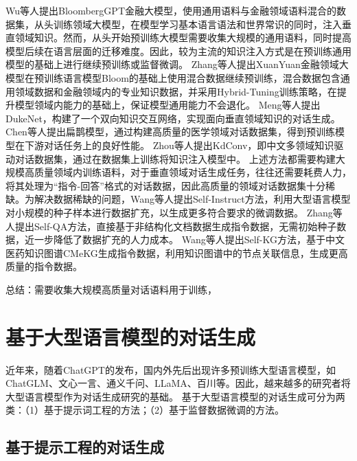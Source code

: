 Wu等人\cite{DBLP:journals/corr/abs-2303-17564}提出BloombergGPT金融大模型，使用通用语料与金融领域语料混合的数据集，从头训练领域大模型，在模型学习基本语言语法和世界常识的同时，注入垂直领域知识。然而，从头开始预训练大模型需要收集大规模的通用语料，同时提高模型后续在语言层面的迁移难度。因此，较为主流的知识注入方式是在预训练通用模型的基础上进行继续预训练或监督微调。
Zhang等人\cite{DBLP:conf/cikm/ZhangY23}提出XuanYuan金融领域大模型在预训练语言模型Bloom的基础上使用混合数据继续预训练，混合数据包含通用领域数据和金融领域内的专业知识数据，并采用Hybrid-Tuning训练策略，在提升模型领域内能力的基础上，保证模型通用能力不会退化。
Meng等人\cite{DBLP:conf/sigir/MengRCSRTR20}提出DukeNet，构建了一个双向知识交互网络，实现面向垂直领域知识的对话生成。
Chen等人\cite{DBLP:journals/corr/abs-2310-15896}提出扁鹊模型，通过构建高质量的医学领域对话数据集，得到预训练模型在下游对话任务上的良好性能。
Zhou等人\cite{DBLP:conf/acl/ZhouZHHZ20}提出KdConv，即中文多领域知识驱动对话数据集，通过在数据集上训练将知识注入模型中。
上述方法都需要构建大规模高质量领域内训练语料，对于垂直领域对话生成任务，往往还需要耗费人力，将其处理为“指令-回答”格式的对话数据，因此高质量的领域对话数据集十分稀缺。为解决数据稀缺的问题，Wang等人\cite{DBLP:conf/acl/WangKMLSKH23}提出Self-Instruct方法，利用大型语言模型对小规模的种子样本进行数据扩充，以生成更多符合要求的微调数据。
Zhang等人\cite{DBLP:journals/corr/abs-2305-11952}提出Self-QA方法，直接基于非结构化文档数据生成指令数据，无需初始种子数据，近一步降低了数据扩充的人力成本。
Wang等人\cite{DBLP:journals/corr/abs-2304-06975}提出Self-KG方法，基于中文医药知识图谱CMeKG生成指令数据，利用知识图谱中的节点关联信息，生成更高质量的指令数据。

总结：需要收集大规模高质量对话语料用于训练，

\section{基于大型语言模型的对话生成}

近年来，随着ChatGPT\cite{DBLP:conf/nips/Ouyang0JAWMZASR22}的发布，国内外先后出现许多预训练大型语言模型，如ChatGLM\cite{DBLP:conf/iclr/ZengLDWL0YXZXTM23}、文心一言\cite{DBLP:journals/corr/abs-2107-02137}、通义千问\cite{DBLP:journals/corr/abs-2309-16609}、LLaMA\cite{DBLP:journals/corr/abs-2302-13971}、百川\cite{DBLP:journals/corr/abs-2309-10305}等。因此，越来越多的研究者将大型语言模型作为对话生成研究的基础。
基于大型语言模型的对话生成可分为两类：（1）基于提示词工程的方法；（2）基于监督数据微调的方法。

\subsection{基于提示工程的对话生成}

